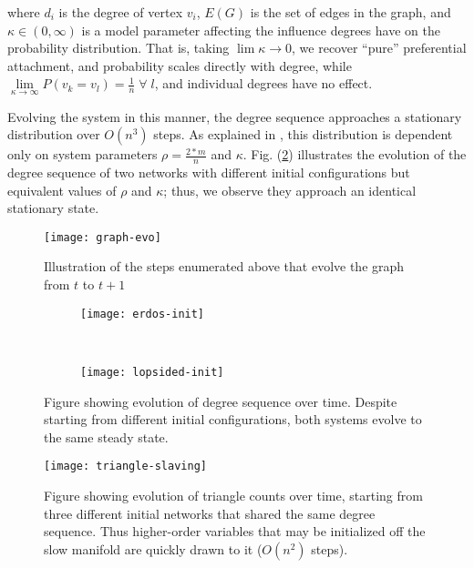 \documentclass[epjST, final]{svjour}
\begin{document}
\begin{onehalfspace}
\noindent where $d_i$ is the degree of vertex $v_i$, $E(G)$ is the set of edges in the graph, and $\kappa \in (0, \infty)$ is a model parameter affecting the influence degrees have on the probability distribution. That is, taking $\lim\limits{\kappa \rightarrow 0}$, we recover ``pure'' preferential attachment, and probability scales directly with degree, while $\lim\limits_{\kappa \rightarrow \infty} P(v_k = v_l) = \frac{1}{n} \; \forall \; l$, and individual degrees have no effect. \par

Evolving the system in this manner, the degree sequence approaches a stationary distribution over $O(n^3)$ steps. As explained in \cite{rath_time_2009}, this distribution is dependent only on system parameters $\rho = \frac{2*m}{n}$ and $\kappa$. Fig. (\ref{fig:dse}) illustrates the evolution of the degree sequence of two networks with different initial configurations but equivalent values of $\rho$ and $\kappa$; thus, we observe they approach an identical stationary state.

\begin{figure}[ht!]
  \centering
  \texttt{[image: graph-evo]}
  \caption{Illustration of the steps enumerated above that evolve the graph from $t$ to $t+1$ \label{fig:step-illustration}}
\end{figure}

\begin{figure}[h!]
  \vspace{-5mm}
  \centering
  \begin{subfigure}{0.75\textwidth}
    \centering
    \texttt{[image: erdos-init]}
  \end{subfigure} \\ %
  \begin{subfigure}{0.75\textwidth}
    \centering
    \texttt{[image: lopsided-init]}
  \end{subfigure}%
  \caption{Figure showing evolution of degree sequence over time. Despite starting from different initial configurations, both systems evolve to the same steady state. \label{fig:dse}}
\end{figure}


\begin{figure}[ht!]
  \centering
  \texttt{[image: triangle-slaving]}
  \caption{Figure showing evolution of triangle counts over time,
    starting from three different initial networks that shared the
    same degree sequence. Thus higher-order variables that may be
    initialized off the slow manifold are quickly drawn to it
    ($O(n^2)$ steps). \label{fig:sv}}
\end{figure}


\end{onehalfspace}
\end{document}
